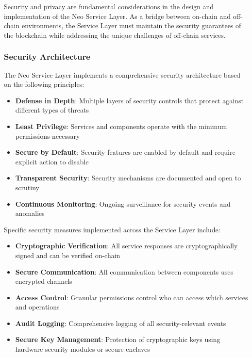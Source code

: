 Security and privacy are fundamental considerations in the design and implementation of the Neo Service Layer. As a bridge between on-chain and off-chain environments, the Service Layer must maintain the security guarantees of the blockchain while addressing the unique challenges of off-chain services.

\subsubsection{Security Architecture}
\label{subsubsec:security-architecture}

The Neo Service Layer implements a comprehensive security architecture based on the following principles:

\begin{itemize}
    \item \textbf{Defense in Depth}: Multiple layers of security controls that protect against different types of threats
    \item \textbf{Least Privilege}: Services and components operate with the minimum permissions necessary
    \item \textbf{Secure by Default}: Security features are enabled by default and require explicit action to disable
    \item \textbf{Transparent Security}: Security mechanisms are documented and open to scrutiny
    \item \textbf{Continuous Monitoring}: Ongoing surveillance for security events and anomalies
\end{itemize}

Specific security measures implemented across the Service Layer include:

\begin{itemize}
    \item \textbf{Cryptographic Verification}: All service responses are cryptographically signed and can be verified on-chain
    \item \textbf{Secure Communication}: All communication between components uses encrypted channels
    \item \textbf{Access Control}: Granular permissions control who can access which services and operations
    \item \textbf{Audit Logging}: Comprehensive logging of all security-relevant events
    \item \textbf{Secure Key Management}: Protection of cryptographic keys using hardware security modules or secure enclaves
\end{itemize}

